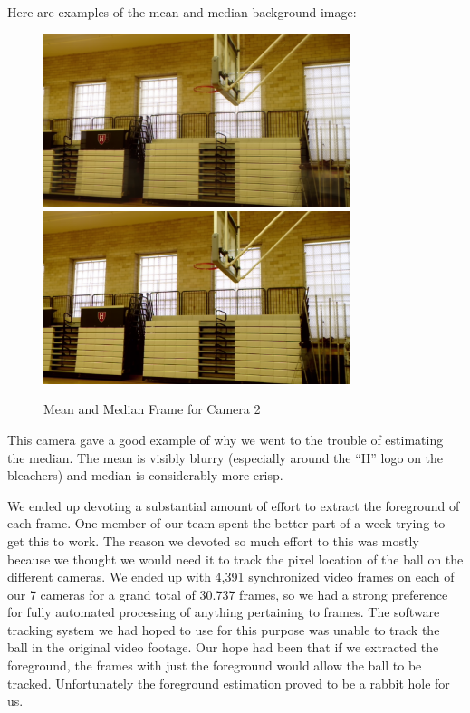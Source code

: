 \documentclass{article}
\begin{document}
Here are examples of the mean and median background image:
\begin{figure}[H]
\centering
\includegraphics[width=0.80\textwidth]{Camera2_mean.png}
\includegraphics[width=0.80\textwidth]{Camera2_median.png}
\caption*{Mean and Median Frame for Camera 2}
\end{figure}
This camera gave a good example of why we went to the trouble of estimating the median.
The mean is visibly blurry (especially around the ``H'' logo on the bleachers) and median is considerably more crisp.

We ended up devoting a substantial amount of effort to extract the foreground of each frame.
One member of our team spent the better part of a week trying to get this to work.
The reason we devoted so much effort to this was mostly because we thought we would need it
to track the pixel location of the ball on the different cameras.  
We ended up with 4,391 synchronized video frames on each of our 7 cameras for a grand total of
30.737 frames, so we had a strong preference for fully automated processing of anything pertaining to frames.
The software tracking system we had hoped to use for this purpose was unable to track the ball in the original video footage.
Our hope had been that if we extracted the foreground, the frames with just the foreground would allow the ball to be tracked.
Unfortunately the foreground estimation proved to be a rabbit hole for us.
\end{document}
